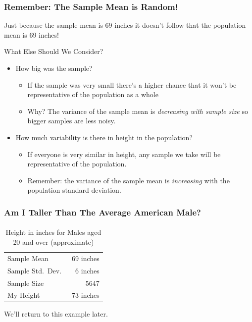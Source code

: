 \documentclass[handout]{beamer}
\begin{document}
\begin{frame}
\frametitle{Remember: The Sample Mean is Random!}

\alert{Just because the sample mean is 69 inches it doesn't follow that the population mean is 69 inches!}


\begin{block}{What Else Should We Consider?}
	\begin{itemize}\pause
		\item How big was the sample? \pause
			\begin{itemize}
				\item If the sample was very small there's a higher chance that it won't be representative of the population as a whole \pause
				\item Why? The variance of the sample mean is \emph{decreasing with sample size} so bigger samples are less noisy. \pause
			\end{itemize}
		\item How much variability is there in height in the population?	\pause
			\begin{itemize}
				\item If everyone is very similar in height, any sample we take will be representative of the population. \pause
				\item Remember: the variance of the sample mean is \emph{increasing} with the population standard deviation. 
			\end{itemize}
	\end{itemize}
\end{block}

\end{frame}
\begin{frame}
\frametitle{Am I Taller Than The Average American Male?}
\framesubtitle{\href{http://www.cdc.gov/nchs/data/series/sr_11/sr11_252.pdf}{}}

	
	\begin{table}[h]
	\caption{Height in inches for Males aged 20 and over (approximate)}
		\begin{tabular}{|lr|}
		\hline
			Sample Mean & 69 inches\\
			Sample Std.\ Dev.\ & 6 inches\\
			Sample Size & 5647 \\
			\hline
			My Height & 73 inches\\
			\hline
		\end{tabular}
	\end{table}

\vspace{2em}
\alert{We'll return to this example later.}

\end{frame}
\end{document}
